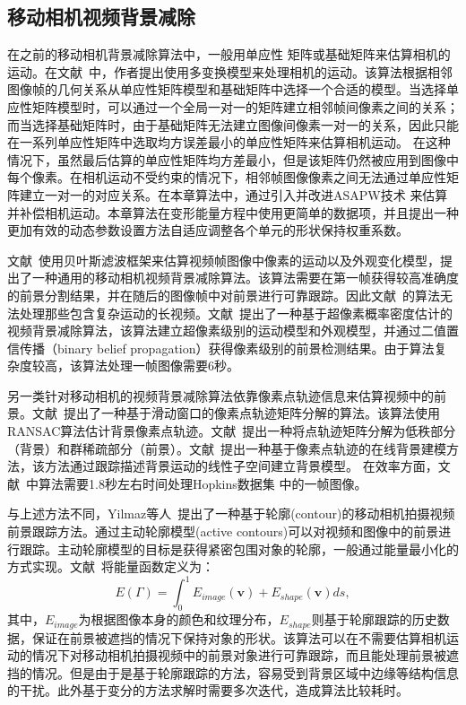 \subsection{移动相机视频背景减除}
\label{ch4:sec:sub:mcbs}
在之前的移动相机背景减除算法中，一般用单应性 矩阵或基础矩阵来估算相机的运动。在文献~中，作者提出使用多变换模型来处理相机的运动。该算法根据相邻图像帧的几何关系从单应性矩阵模型和基础矩阵中选择一个合适的模型。当选择单应性矩阵模型时，可以通过一个全局一对一的矩阵建立相邻帧间像素之间的关系；而当选择基础矩阵时，由于基础矩阵无法建立图像间像素一对一的关系，因此只能在一系列单应性矩阵中选取均方误差最小的单应性矩阵来估算相机运动。 在这种情况下，虽然最后估算的单应性矩阵均方差最小，但是该矩阵仍然被应用到图像中每个像素。在相机运动不受约束的情况下，相邻帧图像像素之间无法通过单应性矩阵建立一对一的对应关系。在本章算法中，通过引入并改进ASAPW技术 \cite{Liu2009ASAP,Liu_2013ASAP}来估算并补偿相机运动。本章算法在变形能量方程中使用更简单的数据项，并且提出一种更加有效的动态参数设置方法自适应调整各个单元的形状保持权重系数。 \par

文献~使用贝叶斯滤波框架来估算视频帧图像中像素的运动以及外观变化模型，提出了一种通用的移动相机视频背景减除算法。该算法需要在第一帧获得较高准确度的前景分割结果，并在随后的图像帧中对前景进行可靠跟踪。因此文献~的算法无法处理那些包含复杂运动的长视频。文献~提出了一种基于超像素概率密度估计的视频背景减除算法，该算法建立超像素级别的运动模型和外观模型，并通过二值置信传播（binary belief propagation）获得像素级别的前景检测结果。由于算法复杂度较高，该算法处理一帧图像需要6秒。\par

另一类针对移动相机的视频背景减除算法依靠像素点轨迹信息来估算视频中的前景。文献~提出了一种基于滑动窗口的像素点轨迹矩阵分解的算法。该算法使用RANSAC\cite{Ransac}算法估计背景像素点轨迹。文献~提出一种将点轨迹矩阵分解为低秩部分（背景）和群稀疏部分（前景）。文献~提出一种基于像素点轨迹的在线背景建模方法，该方法通过跟踪描述背景运动的线性子空间建立背景模型。 在效率方面，文献~中算法需要1.8秒左右时间处理Hopkins数据集\cite{HopKinsDataSet} 中的一帧图像。\par

与上述方法不同，Yilmaz等人~\cite{contourTracking04}提出了一种基于轮廓(contour)的移动相机拍摄视频前景跟踪方法。通过主动轮廓模型(active contours)\cite{Snakes}可以对视频和图像中的前景进行跟踪。主动轮廓模型的目标是获得紧密包围对象的轮廓，一般通过能量最小化的方式实现。文献~将能量函数定义为：
$$ E(\Gamma) = \int_{0}^{1} E_{image}(\mathbf{v})+ E_{shape}(\mathbf{v}) ds,$$
其中，$E_{image}$为根据图像本身的颜色和纹理分布，$E_{shape}$则基于轮廓跟踪的历史数据，保证在前景被遮挡的情况下保持对象的形状。该算法可以在不需要估算相机运动的情况下对移动相机拍摄视频中的前景对象进行可靠跟踪，而且能处理前景被遮挡的情况。但是由于是基于轮廓跟踪的方法，容易受到背景区域中边缘等结构信息的干扰。此外基于变分的方法求解时需要多次迭代，造成算法比较耗时。

